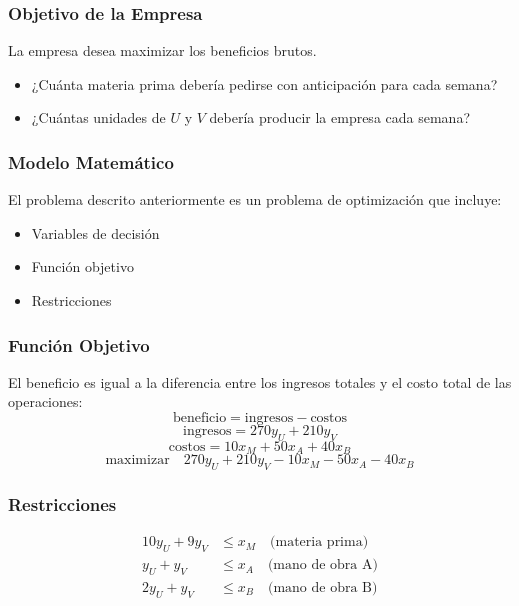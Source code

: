 \documentclass{beamer}
\begin{document}
\begin{frame}
\frametitle{Objetivo de la Empresa}
La empresa desea maximizar los beneficios brutos.

\begin{itemize}
    \item ¿Cuánta materia prima debería pedirse con anticipación para cada semana?
    \item ¿Cuántas unidades de $U$ y $V$ debería producir la empresa cada semana?
\end{itemize}
\end{frame}

\begin{frame}
\frametitle{Modelo Matemático}
El problema descrito anteriormente es un problema de optimización que incluye:
\begin{itemize}
    \item Variables de decisión
    \item Función objetivo
    \item Restricciones
\end{itemize}

\centering
{}
\end{frame}

\begin{frame}
\frametitle{Función Objetivo}
El beneficio es igual a la diferencia entre los ingresos totales y el costo total de las operaciones:
$$
\text{beneficio} = \text{ingresos} - \text{costos}
$$
$$
\text{ingresos} = 270 y_U + 210 y_V
$$
$$
\text{costos} = 10 x_M + 50 x_A + 40 x_B
$$
$$
\text{maximizar} \quad 270 y_U + 210 y_V - 10 x_M - 50 x_A - 40 x_B
$$
\end{frame}

\begin{frame}
\frametitle{Restricciones}
$$
\begin{aligned}
    10 y_U + 9 y_V &\leq x_M \quad \text{(materia prima)} \\
    y_U + y_V &\leq x_A \quad \text{(mano de obra A)} \\
    2 y_U + y_V &\leq x_B \quad \text{(mano de obra B)} \\
\end{aligned}
$$
\end{frame}
\end{document}
